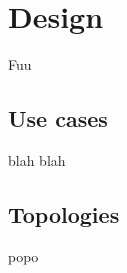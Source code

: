 \section{Design}

\thispagestyle{empty}

Fuu

\subsection{Use cases}
blah blah

\subsection{Topologies}
popo